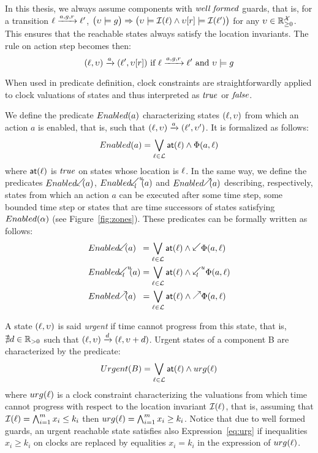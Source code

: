 In this thesis, we always assume components with $\emph{well formed}$
guards, that is, for a transition $\ell\xrightarrow{a,g,r}\ell'$,
$\big(\upsilon\models g\big)\Rightarrow\big(\upsilon\models\mathcal{I}(\ell)\wedge\upsilon[r]\models
\mathcal{I}(\ell')\big)$ for any $\upsilon\in\mathbb{R}_{\ge 0}^{\mathcal{X}}$. This ensures that the reachable states
always satisfy the location invariants. The rule on action step becomes then:
\begin{displaymath}
  (\ell,\upsilon)\xrightarrow{a}(\ell',\upsilon[r])\text{ if } \ell\xrightarrow{a,g,r}
      \ell'\text{ and } \upsilon\models g 
\end{displaymath}
\begin{remark}
  When used in predicate definition, clock constraints are straightforwardly 
  applied to clock valuations of states and thus interpreted as $\textnormal{\textit{true}}$
  or $\textnormal{\textit{false}}$.
\end{remark}
We define the predicate $Enabled(a)$ characterizing states $(\ell,\upsilon)$
from which an action $a$ is enabled, that is, such that $(\ell,\upsilon)
\xrightarrow{a}(\ell',\upsilon')$. It is formalized as follows:
\begin{displaymath}
  Enabled(a)=\bigvee_{\ell\in\mathcal{L}}\textsf{at}(\ell)\wedge\Phi(a,\ell)
\end{displaymath}
where $\textsf{at}(\ell)$ is $\textnormal{\textit{true}}$ on states whose location is $\ell$.
In the same way, we define the predicates $\enabledbackward{a}$,
$\enabledbackwardb{a}{l}{u}$ and $\enabledforward{a}$ describing, respectively,
states from which an action $a$ can be executed after some time step,
some bounded time step or states that are time successors of states satisfying $Enabled(\alpha)$
(see Figure~\ref{fig:zones}). These predicates can be formally written 
as follows:
\begin{align*}
  &\enabledbackward{a}\hspace{1.8mm}=\bigvee_{\loc\in\Loc}\al{\loc}\wedge
  \backward\Phi(a,\loc)  \\
  &\enabledbackwardb{a}{l}{u}=\bigvee_{\loc\in\Loc}\al{\loc}\wedge
  \backwardp{l}{u}\Phi(a,\loc)\\
  &\enabledforward{a}\hspace{1.9mm}=\bigvee_{\loc\in\Loc}\al{\loc}\wedge
  \forward\Phi(a,\loc)
\end{align*}

A state $(\ell,\upsilon)$ is said \emph{urgent} if time cannot progress from
this state, that is, $\nexists d\in\mathbb{R}_{> 0}$ such that $(\ell,\upsilon)\xrightarrow{d}
(\ell,\upsilon+d)$. Urgent states of a component B are characterized by the predicate:
\begin{equation}\label{eq:urg}
  Urgent(B)=\bigvee_{\ell\in\mathcal{L}}\textsf{at}(\ell)\wedge urg(\ell)
\end{equation}
where $urg(\ell)$ is a clock constraint characterizing the valuations from
which time cannot progress with respect to the location invariant 
$\mathcal{I}(\ell)$, that is, assuming that 
$\mathcal{I}(\ell)=\bigwedge_{i=1}^m x_i\le k_i$ then 
$urg(\ell)=\bigwedge_{i=1}^m x_i\ge k_i$. Notice that due to well formed
guards, an urgent reachable state satisfies also Expression~\ref{eq:urg} if inequalities
$x_i\ge k_i$ on clocks are replaced by equalities $x_i=k_i$ in the expression
of $urg(\ell)$.

